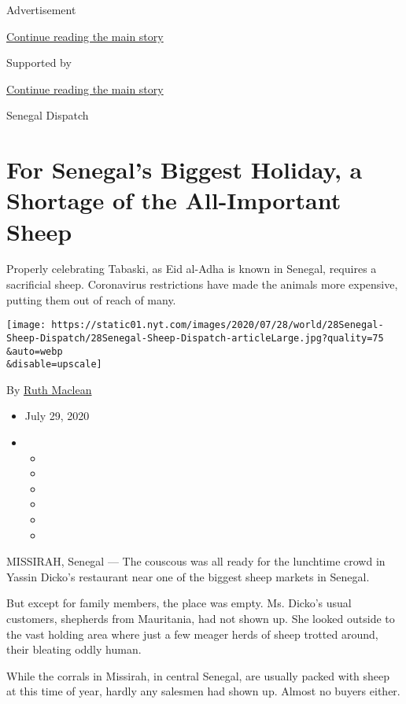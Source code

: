 Advertisement

\protect\hyperlink{after-top}{Continue reading the main story}

Supported by

\protect\hyperlink{after-sponsor}{Continue reading the main story}

Senegal Dispatch

\hypertarget{for-senegals-biggest-holiday-a-shortage-of-the-all-important-sheep}{%
\section{For Senegal's Biggest Holiday, a Shortage of the All-Important
Sheep}\label{for-senegals-biggest-holiday-a-shortage-of-the-all-important-sheep}}

Properly celebrating Tabaski, as Eid al-Adha is known in Senegal,
requires a sacrificial sheep. Coronavirus restrictions have made the
animals more expensive, putting them out of reach of many.

\texttt{[image: https://static01.nyt.com/images/2020/07/28/world/28Senegal-Sheep-Dispatch/28Senegal-Sheep-Dispatch-articleLarge.jpg?quality=75\\\&auto=webp\\\&disable=upscale]}

By \href{https://www.nytimes.com/by/ruth-maclean}{Ruth Maclean}

\begin{itemize}
\item
  July 29, 2020
\item
  \begin{itemize}
  \item
  \item
  \item
  \item
  \item
  \item
  \end{itemize}
\end{itemize}

MISSIRAH, Senegal --- The couscous was all ready for the lunchtime crowd
in Yassin Dicko's restaurant near one of the biggest sheep markets in
Senegal.

But except for family members, the place was empty. Ms. Dicko's usual
customers, shepherds from Mauritania, had not shown up. She looked
outside to the vast holding area where just a few meager herds of sheep
trotted around, their bleating oddly human.

While the corrals in Missirah, in central Senegal, are usually packed
with sheep at this time of year, hardly any salesmen had shown up.
Almost no buyers either.

